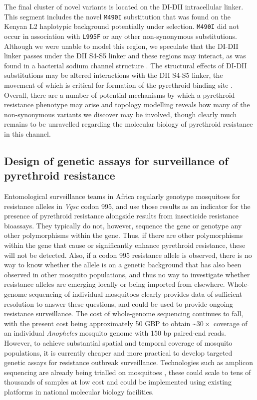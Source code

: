 \documentclass[a4paper,11pt,abstracton,hidelinks]{scrartcl}
\begin{document}
%
The final cluster of novel variants is located on the DI-DII intracellular linker. 
%
This segment includes the novel \texttt{M490I} substitution that was found on the Kenyan L2 haplotypic background potentially under selection.
%
\texttt{M490I} did not occur in association with \texttt{L995F} or any other non-synonymous substitutions.
%
Although we were unable to model this region, we speculate that the DI-DII linker passes under the DII S4-S5 linker and these regions may interact, as was found in a bacterial sodium channel structure \cite{Sula2017}.
%
The structural effects of DI-DII substitutions may be altered interactions with the DII S4-S5 linker, the movement of which is critical for formation of the pyrethroid binding site \cite{OReilly2006, Usherwood2007}. 
%
Overall, there are a number of potential mechanisms by which a pyrethroid resistance phenotype may arise and topology modelling reveals how many of the non-synonymous variants we discover may be involved, though clearly much remains to be unravelled regarding the molecular biology of pyrethroid resistance in this channel.


\subsection*{Design of genetic assays for surveillance of pyrethroid resistance}

%
Entomological surveillance teams in Africa regularly genotype mosquitoes for resistance alleles in \textit{Vgsc} codon 995, and use those results as an indicator for the presence of pyrethroid resistance alongside results from insecticide resistance bioassays.
%
They typically do not, however, sequence the gene or genotype any other polymorphisms within the gene.
%
Thus, if there are other polymorphisms within the gene that cause or significantly enhance pyrethroid resistance, these will not be detected.
%
Also, if a codon 995 resistance allele is observed, there is no way to know whether the allele is on a genetic background that has also been observed in other mosquito populations, and thus no way to investigate whether resistance alleles are emerging locally or being imported from elsewhere.
%
Whole-genome sequencing of individual mosquitoes clearly provides data of sufficient resolution to answer these questions, and could be used to provide ongoing resistance surveillance.
%
The cost of whole-genome sequencing continues to fall, with the present cost being approximately 50 GBP to obtain \textasciitilde$30\times$ coverage of an individual \emph{Anopheles} mosquito genome with 150 bp paired-end reads.
%
However, to achieve substantial spatial and temporal coverage of mosquito populations, it is currently cheaper and more practical to develop targeted genetic assays for resistance outbreak surveillance.
%
Technologies such as amplicon sequencing \cite{Kilianski2015} are already being trialled on mosquitoes \cite{lucas2019high}, these could scale to tens of thousands of samples at low cost and could be implemented using existing platforms in national molecular biology facilities.
%
\end{document}
